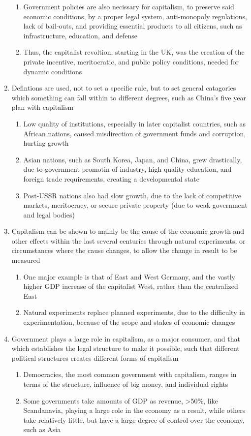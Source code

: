 \begin{enumerate}
\begin{enumerate}
\item Government policies are also necissary for capitalism, to preserve said economic conditions, by a proper legal system, anti-monopoly regulations, lack of bail-outs, and providing essential products to all citizens, such as infrastructure, education, and defense
\item Thus, the capitalist revoltion, starting in the UK, was the creation of the private incentive, meritocratic, and public policy conditions, needed for dynamic conditions
\end{enumerate}
\item Defintions are used, not to set a specific rule, but to set general catagories which something can fall within to different degrees, such as China's five year plan with capitalism
\begin{enumerate}
\item Low quality of institutions, especially in later capitalist countries, such as African nations, caused misdirection of government funds and corruption, hurting growth
\item Asian nations, such as South Korea, Japan, and China, grew drastically, due to government promotin of industry, high quality education, and foreign trade requirements, creating a developmental state
\item Post-USSR nations also had slow growth, due to the lack of competitive markets, meritocracy, or secure private property (due to weak government and legal bodies)
\end{enumerate}
\item Capitalism can be shown to mainly be the cause of the economic growth and other effects within the last several centuries through natural experiments, or circumstances where the cause changes, to allow the change in result to be measured
\begin{enumerate}
\item One major example is that of East and West Germany, and the vastly higher GDP increase of the capitalist West, rather than the centralized East
\item Natural experiments replace planned experiments, due to the difficulty in experimentation, because of the scope and stakes of economic changes
\end{enumerate}
\item Government plays a large role in capitalism, as a major consumer, and that which establishes the legal structure to make it possible, such that different political structures creates different forms of capitalism
\begin{enumerate}
\item Democracies, the most common government with capitalism, ranges in terms of the structure, influence of big money, and individual rights
\item Some governments take amounts of GDP as revenue, >50\%, like Scandanavia, playing a large role in the economy as a result, while others take relatively little, but have a large degree of control over the economy, such as Asia
\end{enumerate}
\end{enumerate}

